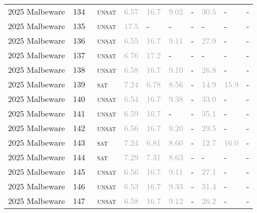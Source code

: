 \begin{center}
{\begin{longtable}{@{}llllllllll@{}}
2025 Malbeware & 134 & ~\textsc{unsat} & \textcolor{darkgray}{6.57} & \textcolor{darkgray}{16.7} & \textcolor{darkgray}{9.02} & - & \textcolor{darkgray}{30.5} & - & - \\
2025 Malbeware & 135 & ~\textsc{unsat} & \textcolor{darkgray}{17.5} & - & - & - & - & - & - \\
2025 Malbeware & 136 & ~\textsc{unsat} & \textcolor{darkgray}{6.55} & \textcolor{darkgray}{16.7} & \textcolor{darkgray}{9.11} & - & \textcolor{darkgray}{27.9} & - & - \\
2025 Malbeware & 137 & ~\textsc{unsat} & \textcolor{darkgray}{6.76} & \textcolor{darkgray}{17.2} & - & - & - & - & - \\
2025 Malbeware & 138 & ~\textsc{unsat} & \textcolor{darkgray}{6.58} & \textcolor{darkgray}{16.7} & \textcolor{darkgray}{9.10} & - & \textcolor{darkgray}{26.8} & - & - \\
2025 Malbeware & 139 & ~\textsc{sat} & \textcolor{darkgray}{7.24} & \textcolor{darkgray}{6.78} & \textcolor{darkgray}{8.56} & - & \textcolor{darkgray}{14.9} & \textcolor{darkgray}{15.9} & - \\
2025 Malbeware & 140 & ~\textsc{unsat} & \textcolor{darkgray}{6.54} & \textcolor{darkgray}{16.7} & \textcolor{darkgray}{9.38} & - & \textcolor{darkgray}{33.0} & - & - \\
2025 Malbeware & 141 & ~\textsc{unsat} & \textcolor{darkgray}{6.59} & \textcolor{darkgray}{16.7} & - & - & \textcolor{darkgray}{35.1} & - & - \\
2025 Malbeware & 142 & ~\textsc{unsat} & \textcolor{darkgray}{6.56} & \textcolor{darkgray}{16.7} & \textcolor{darkgray}{9.20} & - & \textcolor{darkgray}{29.5} & - & - \\
2025 Malbeware & 143 & ~\textsc{sat} & \textcolor{darkgray}{7.24} & \textcolor{darkgray}{6.81} & \textcolor{darkgray}{8.60} & - & \textcolor{darkgray}{12.7} & \textcolor{darkgray}{16.0} & - \\
2025 Malbeware & 144 & ~\textsc{sat} & \textcolor{darkgray}{7.29} & \textcolor{darkgray}{7.31} & \textcolor{darkgray}{8.63} & - & - & - & - \\
2025 Malbeware & 145 & ~\textsc{unsat} & \textcolor{darkgray}{6.56} & \textcolor{darkgray}{16.7} & \textcolor{darkgray}{9.11} & - & \textcolor{darkgray}{27.1} & - & - \\
2025 Malbeware & 146 & ~\textsc{unsat} & \textcolor{darkgray}{6.53} & \textcolor{darkgray}{16.7} & \textcolor{darkgray}{9.33} & - & \textcolor{darkgray}{31.4} & - & - \\
2025 Malbeware & 147 & ~\textsc{unsat} & \textcolor{darkgray}{6.58} & \textcolor{darkgray}{16.7} & \textcolor{darkgray}{9.12} & - & \textcolor{darkgray}{26.2} & - & - \\

\end{longtable}}
\end{center}
